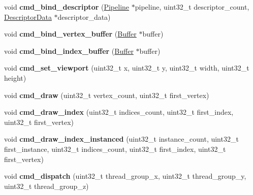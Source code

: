 \begin{DoxyCompactItemize}
\item 
\mbox{\label{classDXRenderer_aeed80317a026c96ee333451550d45707}} 
void {\bfseries cmd\+\_\+bind\+\_\+descriptor} (\hyperlink{classPipeline}{Pipeline} $\ast$pipeline, uint32\+\_\+t descriptor\+\_\+count, \hyperlink{structDescriptorData}{Descriptor\+Data} $\ast$descriptor\+\_\+data)
\item 
\mbox{\label{classDXRenderer_a2030153a259929cd36f4750a60ea3a59}} 
void {\bfseries cmd\+\_\+bind\+\_\+vertex\+\_\+buffer} (\hyperlink{classBuffer}{Buffer} $\ast$buffer)
\item 
\mbox{\label{classDXRenderer_ad166d9f9ddd4d32921ec240b729c2955}} 
void {\bfseries cmd\+\_\+bind\+\_\+index\+\_\+buffer} (\hyperlink{classBuffer}{Buffer} $\ast$buffer)
\item 
\mbox{\label{classDXRenderer_af9ad82aae86ba75516b264dc144e23c7}} 
void {\bfseries cmd\+\_\+set\+\_\+viewport} (uint32\+\_\+t x, uint32\+\_\+t y, uint32\+\_\+t width, uint32\+\_\+t height)
\item 
\mbox{\label{classDXRenderer_a46c26e36f9ec86763113f135423584a5}} 
void {\bfseries cmd\+\_\+draw} (uint32\+\_\+t vertex\+\_\+count, uint32\+\_\+t first\+\_\+vertex)
\item 
\mbox{\label{classDXRenderer_a6b826fbcfd25fcbe3d2996a4c4023e8a}} 
void {\bfseries cmd\+\_\+draw\+\_\+index} (uint32\+\_\+t indices\+\_\+count, uint32\+\_\+t first\+\_\+index, uint32\+\_\+t first\+\_\+vertex)
\item 
\mbox{\label{classDXRenderer_a10c5015e326cef27739116f1a1d18e32}} 
void {\bfseries cmd\+\_\+draw\+\_\+index\+\_\+instanced} (uint32\+\_\+t instance\+\_\+count, uint32\+\_\+t first\+\_\+instance, uint32\+\_\+t indices\+\_\+count, uint32\+\_\+t first\+\_\+index, uint32\+\_\+t first\+\_\+vertex)
\item 
\mbox{\label{classDXRenderer_a477f9b9bec26bde95a0aeae3dd8b7395}} 
void {\bfseries cmd\+\_\+dispatch} (uint32\+\_\+t thread\+\_\+group\+\_\+x, uint32\+\_\+t thread\+\_\+group\+\_\+y, uint32\+\_\+t thread\+\_\+group\+\_\+z)
\item 

\end{DoxyCompactItemize}
